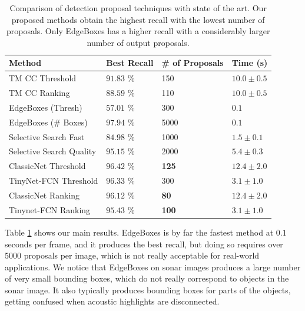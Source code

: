 \begin{table}[t]
    \centering
    \begin{tabular}{llll}
        \hline 
        Method 						& Best Recall 		& \# of Proposals & Time (s)\\ 
        \hline
        TM CC Threshold				& $91.83$ \% 	& 150 & $10.0 \pm 0.5$\\
        TM CC Ranking				& $88.59$ \% 	& 110 & $10.0 \pm 0.5$\\		
        \hline 
        EdgeBoxes (Thresh)			& $57.01$ \%	& 300	& $0.1$\\ 
        EdgeBoxes (\# Boxes)		& $\mathbf{97.94}$ \%	& 5000	& $0.1$\\
        \hline
        Selective Search Fast		& $84.98$ \%	& 1000	& $1.5 \pm 0.1$\\
        Selective Search Quality	& $\mathbf{95.15}$ \%	& 2000	& $5.4 \pm 0.3$\\
        \hline						 		
        ClassicNet Threshold				& $\mathbf{96.42}$ \%	& \textbf{125}	& $12.4 \pm 2.0$\\
        TinyNet-FCN Threshold				& $\mathbf{96.33}$ \%	& 300	& $3.1 \pm 1.0$\\
        ClassicNet Ranking					& $\mathbf{96.12}$ \%	& \textbf{80}	& $12.4 \pm 2.0$\\
        Tinynet-FCN Ranking					& $\mathbf{95.43}$ \%	& \textbf{100}	& $3.1 \pm 1.0$\\
        \hline 
    \end{tabular}
    \caption[Comparison of detection proposal techniques with state of the art]{Comparison of detection proposal techniques with state of the art. Our proposed methods obtain the highest recall with the lowest number of proposals. Only EdgeBoxes has a higher recall with a considerably larger number of output proposals.}
    \label{proposals:sotaComparison}
\end{table}

Table \ref{proposals:sotaComparison} shows our main results. EdgeBoxes is by far the fastest method at $0.1$ seconds per frame, and it produces the best recall, but doing so requires over 5000 proposals per image, which is not really acceptable for real-world applications. We notice that EdgeBoxes on sonar images produces a large number of very small bounding boxes, which do not really correspond to objects in the sonar image. It also typically produces bounding boxes for parts of the objects, getting confused when acoustic highlights are disconnected.

